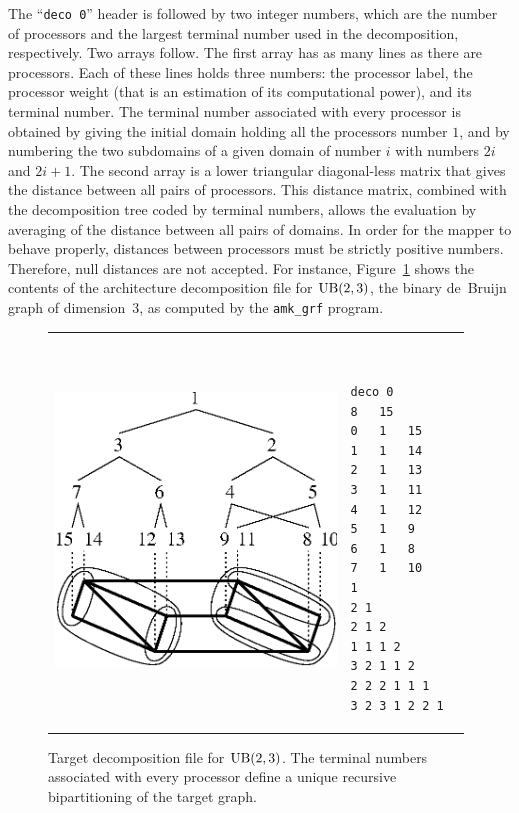The ``\texttt{deco 0}'' header is followed by two integer numbers,
which are the number of processors and the largest terminal number used
in the decomposition, respectively. Two arrays follow.
The first array has as many lines as there are processors. Each of
these lines holds three numbers: the processor label, the processor
weight (that is an estimation of its computational power), and its terminal
number.
The terminal number associated with every processor is obtained by giving the
initial domain holding all the processors number $1$, and by numbering the
two subdomains of a given domain of number $i$ with numbers $2i$ and $2i+1$.
The second array is a lower triangular diagonal-less matrix that gives the
distance between all pairs of processors. This distance matrix, combined with
the decomposition tree coded by terminal numbers, allows the evaluation
by averaging of the distance between all pairs of domains.
In order for the mapper to behave properly, distances between processors must
be strictly positive numbers. Therefore, null distances are not accepted.
For instance, Figure~\ref{fig-file-targetdeco} shows the contents of the
architecture decomposition file for ${\rm UB}(2,3)$, the binary de~Bruijn graph of
dimension~$3$, as computed by the \texttt{amk\_grf} program.
\begin{figure}[hbt]
\begin{tabular}{p{0.69\linewidth}@{}p{0.29\linewidth}}
\begin{center}
\parbox[t]{0.9\linewidth}{\vspace{0pt}\includegraphics[width=0.7\linewidth]{s_f_d.ps}}
\end{center}
&
\begin{center}
{\renewcommand{\baselinestretch}{1.05}
\footnotesize\tt
\begin{verbatim}
deco 0
8	15
0	1	15
1	1	14
2	1	13
3	1	11
4	1	12
5	1	9
6	1	8
7	1	10
1
2 1
2 1 2
1 1 1 2
3 2 1 1 2
2 2 2 1 1 1
3 2 3 1 2 2 1
\end{verbatim}
}
\end{center}
\end{tabular}
\caption{Target decomposition file for ${\rm UB}(2,3)$.
         The terminal numbers associated with every processor define a unique
         recursive bipartitioning of the target graph.}
\label{fig-file-targetdeco}
\end{figure}

